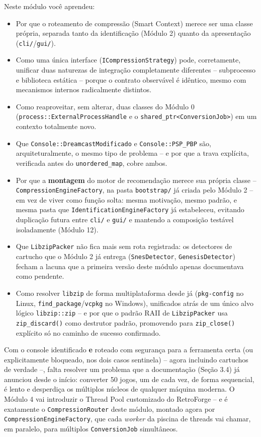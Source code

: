 \begin{CaixaResumo}
Neste módulo você aprendeu:
\begin{itemize}
    \item Por que o roteamento de compressão (Smart Context) merece ser uma classe própria, separada tanto da identificação (Módulo 2) quanto da apresentação (\texttt{cli/}/\texttt{gui/}).
    \item Como uma única interface (\texttt{ICompressionStrategy}) pode, corretamente, unificar duas naturezas de integração completamente diferentes -- subprocesso e biblioteca estática -- porque o contrato observável é idêntico, mesmo com mecanismos internos radicalmente distintos.
    \item Como reaproveitar, sem alterar, duas classes do Módulo 0 (\texttt{process::ExternalProcessHandle} e o \texttt{shared\_ptr<ConversionJob>}) em um contexto totalmente novo.
    \item Que \texttt{Console::DreamcastModificado} e \texttt{Console::PSP\_PBP} são, arquiteturalmente, o mesmo tipo de problema -- e por que a trava explícita, verificada antes do \texttt{unordered\_map}, cobre ambos.
    \item Por que a \textbf{montagem} do motor de recomendação merece sua própria classe -- \texttt{CompressionEngineFactory}, na pasta \texttt{bootstrap/} já criada pelo Módulo 2 -- em vez de viver como função solta: mesma motivação, mesmo padrão, e mesma pasta que \texttt{IdentificationEngineFactory} já estabeleceu, evitando duplicação futura entre \texttt{cli/} e \texttt{gui/} e mantendo a composição testável isoladamente (Módulo 12).
    \item Que \texttt{LibzipPacker} não fica mais sem rota registrada: os detectores de cartucho que o Módulo 2 já entrega (\texttt{SnesDetector}, \texttt{GenesisDetector}) fecham a lacuna que a primeira versão deste módulo apenas documentava como pendente.
    \item Como resolver \texttt{libzip} de forma multiplataforma desde já (\texttt{pkg-config} no Linux, \texttt{find\_package}/\texttt{vcpkg} no Windows), unificados atrás de um único alvo lógico \texttt{libzip::zip} -- e por que o padrão RAII de \texttt{LibzipPacker} usa \texttt{zip\_discard()} como destrutor padrão, promovendo para \texttt{zip\_close()} explícito só no caminho de sucesso confirmado.
\end{itemize}

Com o console identificado \textbf{e} roteado com segurança para a ferramenta certa (ou explicitamente bloqueado, nos dois casos sentinela) -- agora incluindo cartuchos de verdade --, falta resolver um problema que a documentação (Seção 3.4) já anunciou desde o início: converter 50 jogos, um de cada vez, de forma sequencial, é lento e desperdiça os múltiplos núcleos de qualquer máquina moderna. O Módulo 4 vai introduzir o Thread Pool customizado do RetroForge -- e é exatamente o \texttt{CompressionRouter} deste módulo, montado agora por \texttt{CompressionEngineFactory}, que cada \textit{worker} da piscina de threads vai chamar, em paralelo, para múltiplos \texttt{ConversionJob} simultâneos.
\end{CaixaResumo}
